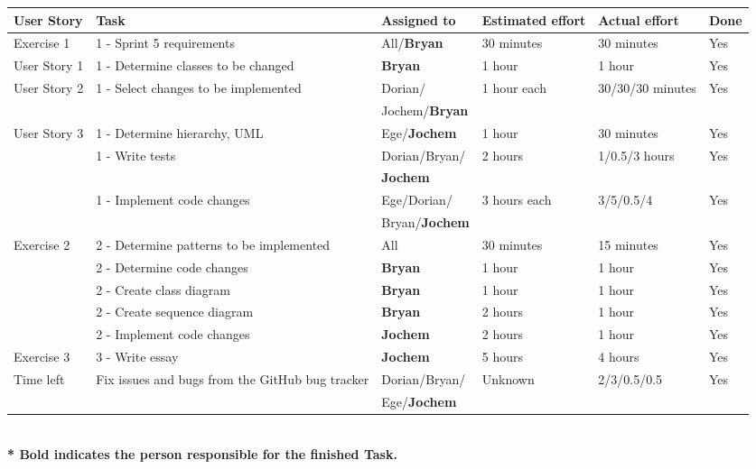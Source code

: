 \documentclass[10pt]{article}
\begin{document}
\begin{center}

    \hspace*{-3cm}\begin{tabular}{ | p{2cm} | p{9cm} | p{2.3cm} | p{2cm} | p{1.8cm} | p{0.8cm} |}
    \hline
    User Story & Task & Assigned to & Estimated effort & Actual effort & Done \\ \hline
    Exercise 1 & 1 - Sprint 5 requirements & All/\textbf{Bryan} & 30 minutes & 30 minutes & Yes\\ 
    User Story 1 & 1 - Determine classes to be changed & \textbf{Bryan} & 1 hour & 1 hour & Yes\\
    User Story 2 & 1 - Select changes to be implemented & Dorian/ & 1 hour each & 30/30/30 minutes & Yes\\ 
    & & Jochem/\textbf{Bryan} & & &\\
    User Story 3 & 1 - Determine hierarchy, UML & Ege/\textbf{Jochem} & 1 hour & 30 minutes & Yes\\ 
    & 1 - Write tests & Dorian/Bryan/  & 2 hours & 1/0.5/3 hours & Yes\\
    & & \textbf{Jochem} & & &\\
    & 1 - Implement code changes & Ege/Dorian/ & 3 hours each & 3/5/0.5/4 & Yes\\ 
    & & Bryan/\textbf{Jochem} & & &\\ \hline    
    Exercise 2 & 2 - Determine patterns to be implemented & All & 30 minutes & 15 minutes & Yes\\ 
    & 2 - Determine code changes & \textbf{Bryan} & 1 hour & 1 hour & Yes\\
    & 2 - Create class diagram & \textbf{Bryan} & 1 hour & 1 hour & Yes\\ 
    & 2 - Create sequence diagram & \textbf{Bryan} & 2 hours & 1 hour & Yes\\ 
    & 2 - Implement code changes & \textbf{Jochem} & 2 hours & 1 hour & Yes \\ \hline    
    Exercise 3 & 3 - Write essay & \textbf{Jochem} & 5 hours & 4 hours & Yes\\
    Time left & Fix issues and bugs from the GitHub bug tracker & Dorian/Bryan/ & Unknown & 2/3/0.5/0.5 & Yes\\  
    & & Ege/\textbf{Jochem} & & &\\ \hline    
    \end{tabular}
    \\ 
    \textbf{* Bold indicates the person responsible for the finished Task. } 
\end{center}
\end{document}
